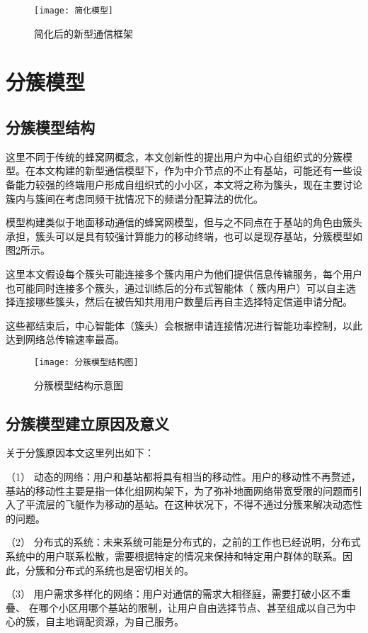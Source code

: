 \begin{figure}[h]
	\centering
	\texttt{[image: 简化模型]}
	\caption{简化后的新型通信框架}
	\label{fig:简化模型}
\end{figure}

\section{分簇模型}
\subsection{分簇模型结构}
这里不同于传统的蜂窝网概念，本文创新性的提出用户为中心自组织式的分簇模型。在本文构建的新型通信模型下，作为中介节点的不止有基站，可能还有一些设备能力较强的终端用户形成自组织式的小小区，本文将之称为簇头，现在主要讨论簇内与簇间在考虑同频干扰情况下的频谱分配算法的优化。

模型构建类似于地面移动通信的蜂窝网模型，但与之不同点在于基站的角色由簇头承担，簇头可以是具有较强计算能力的移动终端，也可以是现存基站，分簇模型如图\ref{fig:分簇模型结构图}所示。

这里本文假设每个簇头可能连接多个簇内用户为他们提供信息传输服务，每个用户也可能同时连接多个簇头，通过训练后的分布式智能体（ 簇内用户）可以自主选择连接哪些簇头，然后在被告知共用用户数量后再自主选择特定信道申请分配。

这些都结束后，中心智能体（簇头）会根据申请连接情况进行智能功率控制，以此达到网络总传输速率最高。
\begin{figure}[h]
	\centering
	\texttt{[image: 分簇模型结构图]}
	\caption{分簇模型结构示意图}
	\label{fig:分簇模型结构图}
\end{figure}

\subsection{分簇模型建立原因及意义}
关于分簇原因本文这里列出如下：

（1） 动态的网络：用户和基站都将具有相当的移动性。用户的移动性不再赘述，基站的移动性主要是指一体化组网构架下，为了弥补地面网络带宽受限的问题而引入了平流层的飞艇作为移动的基站。在这种状况下，不得不通过分簇来解决动态性的问题。

（2） 分布式的系统：未来系统可能是分布式的，之前的工作也已经说明，分布式系统中的用户联系松散，需要根据特定的情况来保持和特定用户群体的联系。因此，分簇和分布式的系统也是密切相关的。

（3） 用户需求多样化的网络：用户对通信的需求大相径庭，需要打破小区不重叠、 在哪个小区用哪个基站的限制，让用户自由选择节点、甚至组成以自己为中心的簇，自主地调配资源，为自己服务。

